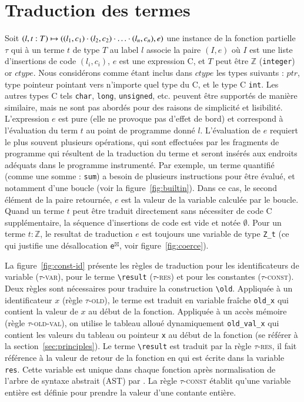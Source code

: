 \section{Traduction des termes \eacsl}
\label{sec:term}




Soit
$(l, t:T) \mapsto ((l_1, c_1) \cdot (l_2, c_2) \cdot \ldots \cdot (l_n, c_n), e)$
une instance de la fonction partielle $\tau$ qui à un terme \eacsl $t$ de type
$T$ au label $l$ associe la paire $(I, e)$ où $I$ est une liste d'insertions de
code $(l_i, c_i)$, $e$ est une expression C, et $T$ peut être $\mathbb{Z}$
(\lstinline'integer') or $ctype$.
Nous considérons comme étant inclus dans $ctype$ les types suivants : $ptr$,
type pointeur pointant vers n'importe quel type du C, et le type C
\lstinline'int'.
Les autres types C tels \lstinline'char', \lstinline'long',
\lstinline'unsigned', etc. peuvent être supportés de manière similaire, mais ne
sont pas abordés pour des raisons de simplicité et lisibilité.
L'expression $e$ est pure (elle ne provoque pas d'effet de bord) et correspond
à l'évaluation du term $t$ au point de programme donné $l$.
L'évaluation de $e$ requiert le plus souvent plusieurs opérations, qui sont
effectuées par les fragments de programme qui résultent de la traduction du
terme et seront insérés aux endroits adéquats dans le programme instrumenté.
Par exemple, un terme quantifié (comme une somme : \lstinline'sum') a besoin de
plusieurs instructions pour être évalué, et notamment d'une boucle (voir la
figure~\ref{fig:builtin}).
Dans ce cas, le second élément de la paire retournée, $e$ est la valeur de la
variable calculée par le boucle.
Quand un terme $t$ peut être traduit directement sans nécessiter de code C
supplémentaire, la séquence d'insertions de code est vide et notée $\emptyset$.
Pour un terme $t:\mathbb{Z}$, le resultat de traduction $e$ est toujours une
variable de type \lstinline'Z_t' (ce qui justifie une désallocation
\lstinline{e}${}^{\boxtimes}$, voir figure~\ref{fig:coerce}).

La figure~\ref{fig:const-id} présente les règles de traduction pour les
identificateurs de variable (\textsc{$\tau$-var}), pour le terme
\lstinline|\result| (\textsc{$\tau$-res}) et pour les constantes
(\textsc{$\tau$-const}).
Deux règles sont nécessaires pour traduire la construction \eacsl
\lstinline|\old|.
Appliquée à un identificateur $x$ (règle \textsc{$\tau$-old}), le terme est
traduit en variable fraîche \lstinline|old_x| qui contient la valeur de $x$ au
début de la fonction.
Appliquée à un accès mémoire (règle \textsc{$\tau$-old-val}), on utilise le
tableau alloué dynamiquement \lstinline|old_val_x| qui contient les valeurs du
tableau ou pointeur \lstinline'x' au début de la fonction (se référer à la
section~\ref{sec:principles}).
Le terme \lstinline|\result| est traduit par la règle \textsc{$\tau$-res}, il
fait référence à la valeur de retour de la fonction en \eacsl qui est écrite
dans la variable \lstinline|res|.
Cette variable est unique dans chaque fonction après normalisation de l'arbre de
syntaxe abstrait (AST) par \framac.
La règle \textsc{$\tau$-const} établit qu'une variable entière est définie pour
prendre la valeur d'une contante entière.

